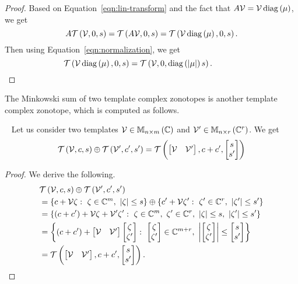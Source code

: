 %
\begin{proof}
Based on Equation~\ref{eqn:lin-transform} and the fact that
$A\mathcal{V}=\mathcal{V}\operatorname{diag}\left(\mu\right)$, we get
%
\[
A\mathit{\operatorname{\mathcal{T}}}\left(\mathcal{V},0,s\right)=\mathit{\operatorname{\mathcal{T}}}\left(A\mathcal{V},0,s\right)=\mathit{\operatorname{\mathcal{T}}}\left(\mathcal{V}\operatorname{diag}\left(\mu\right),0,s\right).
\]
%
Then using Equation~\ref{eqn:normalization}, we get
%
\[
\mathit{\operatorname{\mathcal{T}}}\left(\mathcal{V}\operatorname{diag}\left(\mu\right),0,s\right)=\mathit{\operatorname{\mathcal{T}}}\left(\mathcal{V},0,\operatorname{diag}\left(\left|\mu\right|\right)s\right).~\hspace{3em}\qedhere
\]
\end{proof}

The Minkowski sum of two template complex zonotopes is another
template complex zonotope, which is computed as follows.
%
\begin{lemma}~\label{lem:min-sum}
Let us consider two templates ${\mathcal{V}\in\mathbb{M}_{n\times m}\left(\mathbb{C}\right)}$ and
${\mathcal{V}^\prime\in\mathbb{M}_{n\times r}\left(\mathbb{C}^r\right)}$.  We get
%
\begin{equation}
\mathit{\operatorname{\mathcal{T}}}\left(\mathcal{V},c,s\right)\oplus \mathit{\operatorname{\mathcal{T}}}\left(\mathcal{V}^\prime,c^\prime,s^\prime\right)
= \mathit{\operatorname{\mathcal{T}}}\left(\begin{bmatrix}\mathcal{V} & \mathcal{V}^\prime\end{bmatrix},c+c^\prime,\begin{bmatrix}s\\s^\prime\end{bmatrix}\right)
\end{equation}
\end{lemma}
%
\begin{proof}
We derive the following.
%
\begin{align*}
&
  \mathit{\operatorname{\mathcal{T}}}\left(\mathcal{V},c,s\right)\oplus\mathit{\operatorname{\mathcal{T}}}\left(\mathcal{V}^\prime,c^\prime,s^\prime\right)\\
& =
  \left\{c+\mathcal{V}\zeta:~\zeta\in\mathbb{C}^m,~\left|\zeta\right|\leq s\right\}\oplus\left\{c^\prime+\mathcal{V}\zeta^\prime:~\zeta^\prime\in\mathbb{C}^r,~\left|\zeta^\prime\right|\leq s^\prime\right\}\\
& =
  \left\{\left(c+c^\prime\right)+\mathcal{V}\zeta+\mathcal{V}^\prime\zeta^\prime:~\zeta\in\mathbb{C}^m,~\zeta^\prime\in\mathbb{C}^r,~\left|\zeta\right|\leq s,~\left|\zeta^\prime\right|\leq s^\prime\right\}\\
& =
  \left\{\left(c+c^\prime\right)+\left[\begin{matrix}\mathcal{V}&\mathcal{V}^\prime\end{matrix}\right]\left[\begin{matrix}\zeta\\\zeta^\prime\end{matrix}\right]:~\left[\begin{matrix}\zeta\\\zeta^\prime\end{matrix}\right]\in\mathbb{C}^{m+r},~\left|\left[\begin{matrix}\zeta\\\zeta^\prime\end{matrix}\right]\right|\leq\left[\begin{matrix}s\\s^\prime\end{matrix}\right]\right\}\\
& =  \mathit{\operatorname{\mathcal{T}}}\left(\begin{bmatrix}\mathcal{V} & \mathcal{V}^\prime\end{bmatrix},c+c^\prime,\begin{bmatrix}s\\s^\prime\end{bmatrix}\right).~\hspace{3em}\qedhere
\end{align*}
%
\end{proof}
